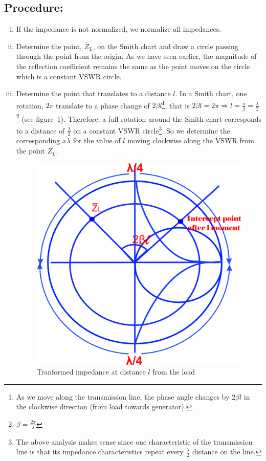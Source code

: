 \subsection*{Procedure:}
\begin{enumerate}[(i)]
\item If the impedance is not normalized, we normalize all impedances.
\item Determine the point, $\bar{Z}_L$, on the Smith chart and draw a circle passing through the point from the origin. As we have seen earlier, the magnitude of the reflection coefficient remains the same as the point moves on the circle which is a constant VSWR circle.
\item Determine the point that translates to a distance $l$. In a Smith chart, one rotation, $2\pi$ translate to a phase change of $2\beta{l}$\footnote{
As we move along the transmission line, the phase angle changes by $2\beta{l}$ in the clockwise direction (from load towards generator).
}, that is $2\beta{l} = 2\pi\Longrightarrow l = \frac{\pi}{\beta} = \frac{\lambda}{2}$\footnote{
$\beta = \frac{2\pi}{\lambda}$
} (see figure~\ref{fig:mjhtre}). Therefore, a full rotation around the Smith chart corresponds to a distance of $\frac{\lambda}{2}$ on a constant VSWR circle\footnote{
The above analysis makes sense since one characteristic of the transmission line is that its impedance characteristics repeat every $\frac{\lambda}{2}$ distance on the line.
}. So we determine the corresponding $x\lambda$ for the value of $l$ moving clockwise along the VSWR from the point $\bar{Z}_L$.
\begin{figure}[h]
\centering
\includegraphics[width=0.7\linewidth]{./graphics/mjhtre}
\caption{Tranformed impedance at distance $l$ from the load}
\label{fig:mjhtre}
\end{figure}


\end{enumerate}
